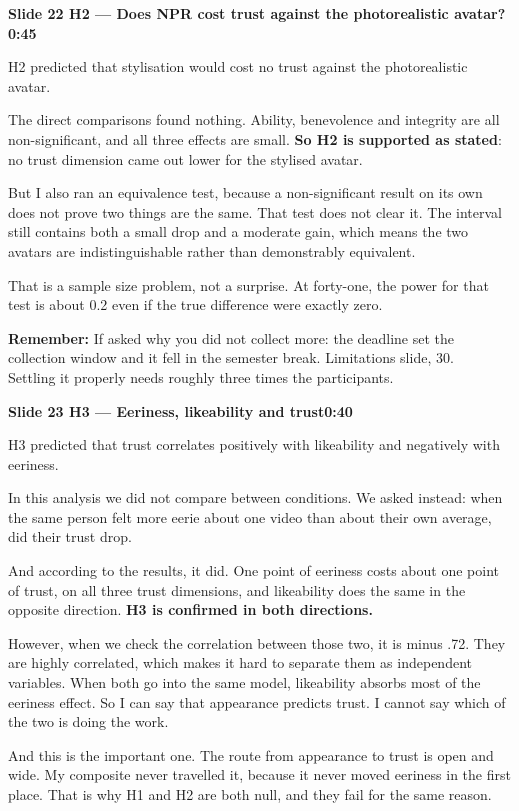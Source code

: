 \documentclass[11pt,a4paper]{article}
\newcommand{\slidehead}[3]{%
  \needspace{5\baselineskip}
  \vspace{0.9em}
  \noindent\colorbox{knblue}{\parbox{0.978\textwidth}{\vspace{1pt}\color{white}\textbf{Slide #1 \quad #2}\hfill\textbf{#3}\vspace{1pt}}}
  \vspace{0.35em}\par}
\newcommand{\remind}[1]{%
  \vspace{0.15em}
  \noindent\colorbox{knlight}{\parbox{0.972\textwidth}{\small\color{knblue}\textbf{Remember:} #1}}
  \vspace{0.2em}\par}
\begin{document}
\slidehead{22}{H2 — Does NPR cost trust against the photorealistic avatar?}{0:45}

H2 predicted that stylisation would cost no trust against the photorealistic avatar.

The direct comparisons found nothing. Ability, benevolence and integrity are all non-significant, and all three effects are small. \textbf{So H2 is supported as stated}: no trust dimension came out lower for the stylised avatar.

But I also ran an equivalence test, because a non-significant result on its own does not prove two things are the same. That test does not clear it. The interval still contains both a small drop and a moderate gain, which means the two avatars are indistinguishable rather than demonstrably equivalent.

That is a sample size problem, not a surprise. At forty-one, the power for that test is about 0.2 even if the true difference were exactly zero.

\remind{If asked why you did not collect more: the deadline set the collection window and it fell in the semester break. Limitations slide, 30.\\[0.4em] Settling it properly needs roughly three times the participants.}

\slidehead{23}{H3 — Eeriness, likeability and trust}{0:40}

H3 predicted that trust correlates positively with likeability and negatively with eeriness.

In this analysis we did not compare between conditions. We asked instead: when the same person felt more eerie about one video than about their own average, did their trust drop.

And according to the results, it did. One point of eeriness costs about one point of trust, on all three trust dimensions, and likeability does the same in the opposite direction. \textbf{H3 is confirmed in both directions.}

However, when we check the correlation between those two, it is minus .72. They are highly correlated, which makes it hard to separate them as independent variables. When both go into the same model, likeability absorbs most of the eeriness effect. So I can say that appearance predicts trust. I cannot say which of the two is doing the work.

And this is the important one. The route from appearance to trust is open and wide. My composite never travelled it, because it never moved eeriness in the first place. That is why H1 and H2 are both null, and they fail for the same reason.
\end{document}
